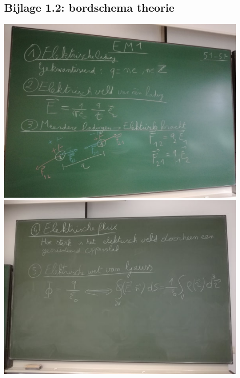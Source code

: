 \subsection*{Bijlage 1.2: bordschema theorie}
\begin{center}
	\includegraphics[width=0.9\textwidth]{Bord1a}
\includegraphics[width=0.9\textwidth]{Bord1b}
\end{center}
\newpage








